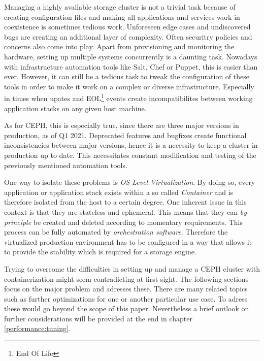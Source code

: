 \documentclass[titlepage, a4paper, 11pt]{scrartcl}
\begin{document}
            Managing a highly available storage cluster is not a trivial task because of creating configuration files and making all applications and services work in coexistence is sometimes tedious work. Unforeseen edge cases and undiscovered bugs are creating an additional layer of complexity. Often securitry policies and concerns also come into play. 
            Apart from provisioning and monitoring the hardware,
            setting up multiple systems concurrently is a daunting task. Nowadays with infrastructure automation tools like Salt, Chef or Puppet, 
            this is easier than ever. However, it can still be a tedious task to tweak the configuration of these tools
            in order to make it work on a complex or diverse infrastructure. Especially in times when upates and EOL\footnote{End Of Life} events
            create incompatibilites between working application stacks on any given host machine.

            As for CEPH, this is especially true, since there are three major versions in production\cite{cephreleases}, as of Q1 2021.
            Deprecated features and bugfixes create functional inconsistencies between major versions, hence it is a necessity to 
            keep a cluster in production up to date. This necessitates constant modification and testing of the previously mentioned automation tools.

            One way to isolate these problems is \textit{OS Level Virtualization}. By doing so, every application or application stack 
            exists within a so called \textit{Container} and is therefore isolated from the host to a certain degree. 
            One inherent issue in this context is that they are stateless and ephemeral. This means that they can 
            \textit{by principle} be created and deleted according to momentary requirements. This process can be fully automated by \textit{orchestration software}. Therefore the virtualized production environment has to be
            configured in a way that allows it to provide the stability which is required for a storage engine.

            Trying to overcome the difficulties in setting up and manage a CEPH cluster with containerization might seem contradicting
            at first sight. The following sections focus on the major problem and adresses these. There are many related topics such as
            further optimizations for one or another particular use case. To adress these would go beyond the scope of this paper.
            Nevertheless a brief outlook on further considerations will be provided at the end in chapter \ref*{performance:tuning}.
\end{document}
